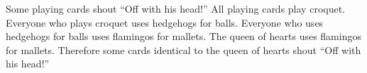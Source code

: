 {\begin{exercises}
\item Some playing cards shout ``Off with his head!'' All playing cards play croquet. Everyone who plays croquet uses hedgehogs for balls. Everyone who uses hedgehogs for balls uses flamingos for mallets. The queen of hearts uses flamingos for mallets. Therefore some cards identical to the queen of hearts shout ``Off with his head!''







\end{exercises}}
